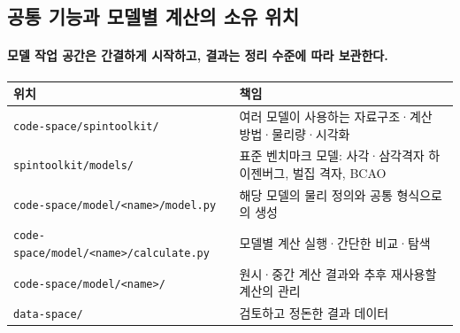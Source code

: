   \smallskip
\endgroup


\subsection{공통 기능과 모델별 계산의 소유 위치}\label{model-workspace}
\begingroup%
  \framesubtitle{모델 작업 공간은 간결하게 시작하고, 결과는 정리 수준에 따라 보관한다.}
  \begin{tabularx}{\textwidth}{@{}p{4.8cm}Y@{}}
    \toprule
    위치 & 책임 \\
    \midrule
    \texttt{code-space/spintoolkit/} & 여러 모델이 사용하는 자료구조·계산 방법·물리량·시각화 \\
    \texttt{spintoolkit/models/} & 표준 벤치마크 모델: 사각·삼각격자 하이젠버그, 벌집 격자, BCAO \\
    \texttt{code-space/model/<name>/model.py} & 해당 모델의 물리 정의와 공통 형식으로의 생성 \\
    \texttt{code-space/model/<name>/calculate.py} & 모델별 계산 실행·간단한 비교·탐색 \\
    \texttt{code-space/model/<name>/} & 원시·중간 계산 결과와 추후 재사용할 계산의 관리 \\
    \texttt{data-space/} & 검토하고 정돈한 결과 데이터 \\
    \bottomrule
  \end{tabularx}
  \par\medskip
\endgroup

